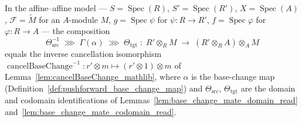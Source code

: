 \begin{lemma}
  \label{lem:pushforward_base_change_mate_sections_direct}
  In the affine--affine model — \(S = \operatorname{Spec}(R)\),
  \(S' = \operatorname{Spec}(R')\), \(X = \operatorname{Spec}(A)\),
  \(\mathcal{F} = \widetilde M\) for an \(A\)-module \(M\), \(g = \operatorname{Spec}\psi\)
  for \(\psi : R \to R'\), \(f = \operatorname{Spec}\varphi\) for \(\varphi : R \to A\) —
  the composition
  \[
    \Theta_{\mathrm{src}}^{-1} \;\ggg\; \Gamma(\alpha) \;\ggg\; \Theta_{\mathrm{tgt}}
    \;:\; R' \otimes_R M
    \;\longrightarrow\; (R' \otimes_R A) \otimes_A M
  \]
  equals the inverse cancellation isomorphism
  \(\operatorname{cancelBaseChange}^{-1} : r' \otimes m \mapsto (r' \otimes 1) \otimes m\)
  of Lemma~\ref{lem:cancelBaseChange_mathlib}, where \(\alpha\) is the base-change map
  (Definition~\ref{def:pushforward_base_change_map}) and \(\Theta_{\mathrm{src}}\),
  \(\Theta_{\mathrm{tgt}}\) are the domain and codomain identifications of
  Lemmas~\ref{lem:base_change_mate_domain_read}
  and~\ref{lem:base_change_mate_codomain_read}.
\end{lemma}

